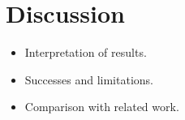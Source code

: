 \chapter{Discussion}
\label{chap:discussion}
\begin{itemize}
    \item Interpretation of results.
    \item Successes and limitations.
    \item Comparison with related work.
\end{itemize}